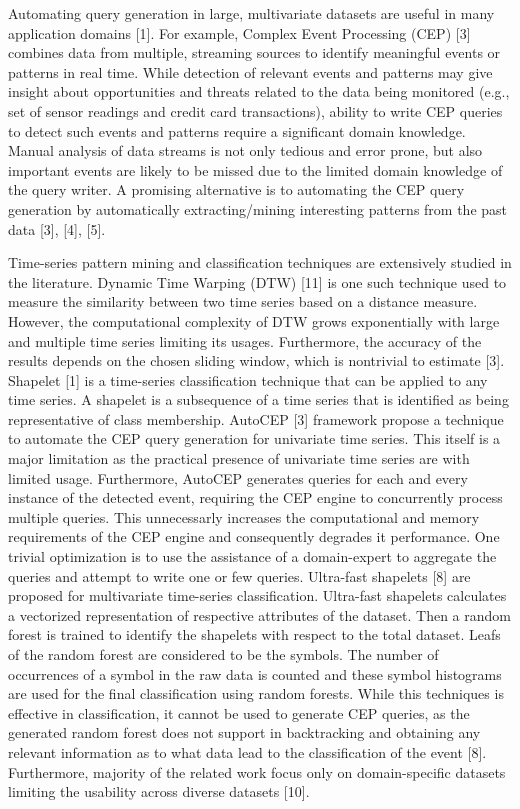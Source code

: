 \documentclass[conference]{IEEEtran}  %
\begin{document}
Automating query generation in large, multivariate datasets are useful in many application domains [1]. For example, Complex Event Processing (CEP) [3] combines data from multiple, streaming sources to identify meaningful events or patterns in real time. While detection of relevant events and patterns may give insight about opportunities and threats related to the data being monitored (e.g., set of sensor readings and credit card transactions), ability to write CEP queries to detect such events and patterns require a significant domain knowledge. Manual analysis of data streams is not only tedious and error prone, but also important events are likely to be missed due to the limited domain knowledge of the query writer. A promising alternative is to automating the CEP query generation by automatically extracting/mining interesting patterns from the past data [3], [4], [5].

Time-series pattern mining and classification techniques are extensively studied in the literature. Dynamic Time Warping (DTW) [11] is one such technique used to measure the similarity between two time series based on a distance measure. However, the computational complexity of DTW grows exponentially with large and multiple time series limiting its usages. Furthermore, the accuracy of the results depends on the chosen sliding window, which is nontrivial to estimate [3]. Shapelet [1] is a time-series classification technique that can be applied to any time series. A shapelet is a subsequence of a time series that is identified as being representative of class membership. AutoCEP [3] framework propose a technique to automate the CEP query generation for univariate time series. This itself is a major limitation as the practical presence of univariate time series are with limited usage. Furthermore, AutoCEP generates queries for each and every instance of the detected event, requiring the CEP engine to concurrently process multiple queries. This unnecessarly increases the computational and memory requirements of the CEP engine and consequently degrades it performance. One trivial optimization is to use the assistance of a domain-expert to aggregate the queries and attempt to write one or few queries. Ultra-fast shapelets [8] are proposed for multivariate time-series classification. Ultra-fast shapelets calculates a vectorized representation of respective attributes of the dataset. Then a random forest is trained to identify the shapelets with respect to the total dataset. Leafs of the random forest are considered to be the symbols. The number of occurrences of a symbol in the raw data is counted and these symbol histograms are used for the final classification using random forests. While this techniques is effective in classification, it cannot be used to generate CEP queries, as the generated random forest does not support in backtracking and obtaining any relevant information as to what data lead to the classification of the event [8]. Furthermore, majority of the related work focus only on domain-specific datasets limiting the usability across diverse datasets [10].
\end{document}
